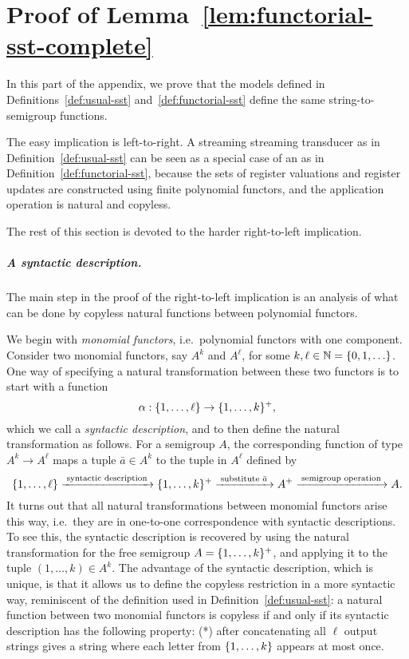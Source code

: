 \section{Proof of Lemma~\ref{lem:functorial-sst-complete}}
In this part of the appendix, we prove that the models defined in Definitions~\ref{def:usual-sst} and~\ref{def:functorial-sst} define the same string-to-semigroup functions.

The easy implication is left-to-right. 
    A streaming streaming transducer as in Definition~\ref{def:usual-sst} can be seen as a special case of an \sst as in Definition~\ref{def:functorial-sst}, because the sets of register valuations and register updates are constructed using finite polynomial functors, and the application operation is natural and copyless. 

The rest of this section is devoted to the harder right-to-left implication. 

\subparagraph*{A syntactic description.} The main step in the proof of the right-to-left implication is an analysis of what can be done by copyless natural functions between polynomial functors.

We begin with \emph{monomial functors}, i.e.~polynomial functors with one component. 
Consider two monomial functors, say $A^k$ and $A^\ell$, for some  $k,\ell \in \mathbb{N} = \{0,1,\ldots\}$.
One way of specifying a natural transformation between these two functors is to start with a function 
\begin{equation}
\label{eq:syntactic-description}    \alpha : \{1,\ldots,\ell\} \to \{1,\ldots,k\}^+,
\end{equation}
which we call a \emph{syntactic description}, and to then  define the  natural transformation as follows. For a semigroup $A$, the corresponding function of type $A^k \to A^\ell$  maps a tuple $\bar a \in A^k$ to the tuple in $A^\ell$ defined by
\[
\{1,\ldots,\ell\}
\xrightarrow{\;\text{syntactic description}\;}
\{1,\ldots,k\}^+ 
\xrightarrow{\;\text{substitute $\bar a$}\;}
A^+
\xrightarrow{\;\text{semigroup operation}\;}
A.
\]
It turns out that all  natural transformations between monomial functors arise this way, i.e.~they are in one-to-one correspondence with syntactic descriptions. To see this, the syntactic description is recovered by using the natural transformation for the free semigroup $A=\{1,\ldots,k\}^+$, and applying it to the tuple $(1,\ldots,k) \in A^k$.
The advantage of the syntactic description, which is unique, is that it allows us to define the  {copyless restriction} in a more syntactic way, reminiscent of the definition used in Definition~\ref{def:usual-sst}:  a natural function between two monomial functors is copyless if and only if its syntactic description has the following property: (*) after concatenating all $\ell$ output strings gives a string where each letter from $\{1,\ldots,k\}$ appears at most once. 

